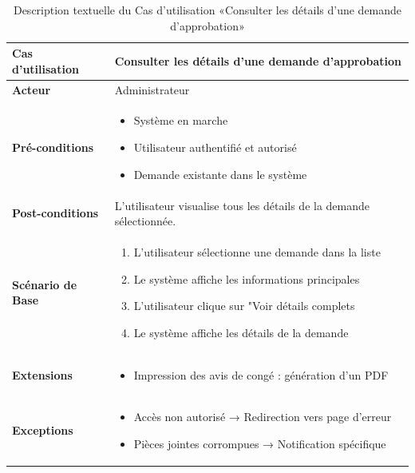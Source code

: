     \begin{table}[!ht]
        \begin{adjustwidth}{-2cm}{-2cm}
        \centering
        \caption{Description textuelle du Cas d'utilisation «Consulter les détails d'une demande d'approbation»}
        \label{tab:consult_request_details}
        \renewcommand{\arraystretch}{1.2}
        \begin{tabular}{|p{4.2cm}|p{13cm}|}
        \hline
        \textbf{Cas d'utilisation} & Consulter les détails d'une demande d'approbation \\
        \hline
        \textbf{Acteur} & Administrateur\\
        \hline
        \textbf{Pré-conditions} & 
        \begin{itemize}
        \item Système en marche
        \item Utilisateur authentifié et autorisé
        \item Demande existante dans le système
        \end{itemize} \\
        \hline
        \textbf{Post-conditions} & L'utilisateur visualise tous les détails de la demande sélectionnée. \\
        \hline
        \textbf{Scénario de Base} & 
        \begin{enumerate}
        \item L'utilisateur sélectionne une demande dans la liste
        \item Le système affiche les informations principales
        \item L'utilisateur clique sur "Voir détails complets
        \item Le système affiche les détails de la demande
        \end{enumerate} \\
        \hline
        \textbf{Extensions} & 
        \begin{itemize}
        \item Impression des avis de congé : génération d'un PDF
        \end{itemize} \\
        \hline
        \textbf{Exceptions} & 
        \begin{itemize}
        \item Accès non autorisé → Redirection vers page d'erreur
        \item Pièces jointes corrompues → Notification spécifique
        \end{itemize} \\
        \hline
        \end{tabular}
        \end{adjustwidth}
        \end{table}
\newpage
